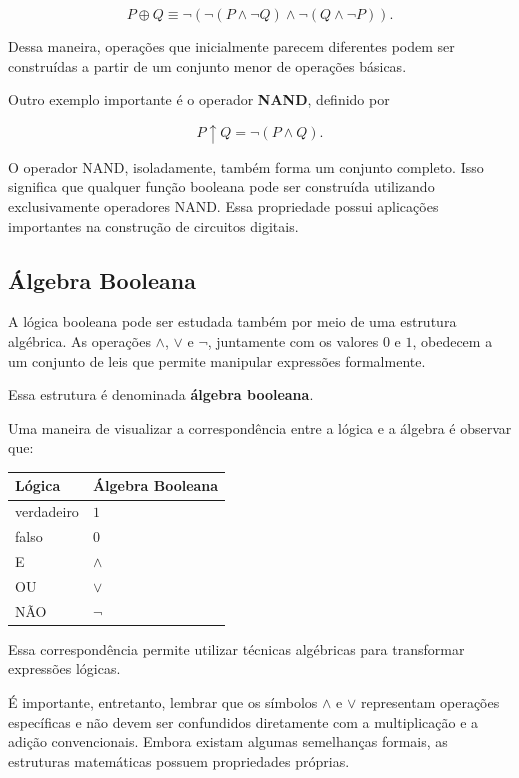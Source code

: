 \documentclass[
  brazilian,
  letterpaper,
]{book}
\theoremstyle{plain}
\theoremstyle{definition}
\theoremstyle{remark}
\begin{document}
\[
P\oplus Q
\equiv
\neg\left(
\neg(P\wedge\neg Q)
\wedge
\neg(Q\wedge\neg P)
\right).
\]

Dessa maneira, operações que inicialmente parecem diferentes podem ser
construídas a partir de um conjunto menor de operações básicas.

Outro exemplo importante é o operador \textbf{NAND}, definido por

\[
P\uparrow Q=\neg(P\wedge Q).
\]

O operador NAND, isoladamente, também forma um conjunto completo. Isso
significa que qualquer função booleana pode ser construída utilizando
exclusivamente operadores NAND. Essa propriedade possui aplicações
importantes na construção de circuitos digitais.

\subsection{Álgebra Booleana}\label{uxe1lgebra-booleana}

A lógica booleana pode ser estudada também por meio de uma estrutura
algébrica. As operações \(\wedge\), \(\vee\) e \(\neg\), juntamente com
os valores \(0\) e \(1\), obedecem a um conjunto de leis que permite
manipular expressões formalmente.

Essa estrutura é denominada \textbf{álgebra booleana}.

Uma maneira de visualizar a correspondência entre a lógica e a álgebra é
observar que:

\begin{longtable*}[]{|l|l|}
\toprule\noalign{}
Lógica & Álgebra Booleana \\
\midrule\noalign{}
\endhead
\bottomrule\noalign{}
\endlastfoot
verdadeiro & \(1\) \\
\midrule
falso & \(0\) \\
\midrule
E & \(\wedge\) \\
\midrule
OU & \(\vee\) \\
\midrule
NÃO & \(\neg\) \\
\end{longtable*}

Essa correspondência permite utilizar técnicas algébricas para
transformar expressões lógicas.

É importante, entretanto, lembrar que os símbolos \(\wedge\) e \(\vee\)
representam operações específicas e não devem ser confundidos
diretamente com a multiplicação e a adição convencionais. Embora existam
algumas semelhanças formais, as estruturas matemáticas possuem
propriedades próprias.
\end{document}
